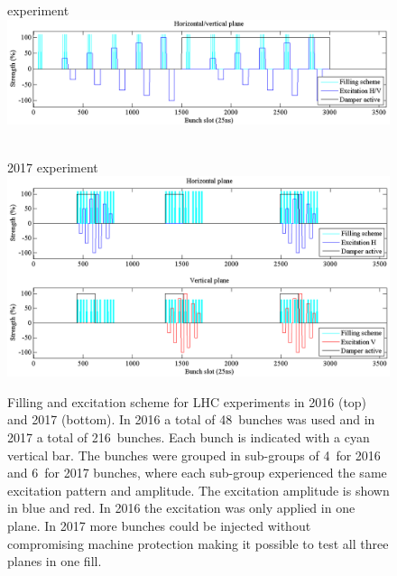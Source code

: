 \documentclass[%
 reprint,
 amsmath,amssymb,
 aps,
prstab,
longbibliography,
]{revtex4-1}
\begin{document}
\begin{figure}
	\begin{minipage}[t]{1.0\linewidth}
		 experiment\\
		\includegraphics[width=0.9\linewidth]{bunchfilling_2016.png}	
	\end{minipage}
	\begin{minipage}[t]{1.0\linewidth}
		\centering
		$ $\\
		2017 experiment\\
		\includegraphics[width=0.9\linewidth]{bunchfilling_2017.png}	
	\end{minipage}
	\caption{\label{fig:fill} Filling and excitation scheme for LHC experiments in 2016 (top) and 2017 (bottom). In 2016 a total of 48~bunches was used and in 2017 a total of 216~bunches. Each bunch is indicated with a cyan vertical bar. The bunches were grouped in sub-groups of 4~for 2016 and 6~for 2017 bunches, where each sub-group experienced the same excitation pattern and amplitude. The excitation amplitude is shown in blue and red. In 2016 the excitation was only applied in one plane. In 2017 more bunches could be injected without compromising machine protection making it possible to test all three planes in one fill.}
\end{figure}
\end{document}
